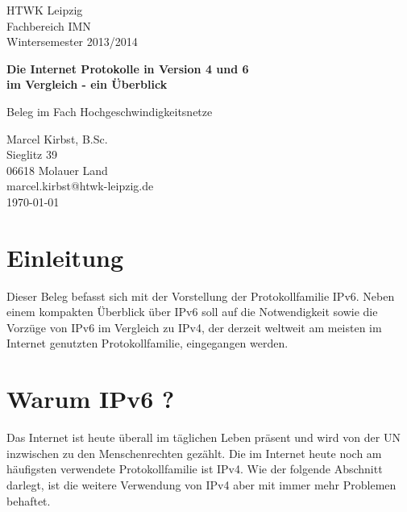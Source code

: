 \documentclass[a4paper,12pt]{scrartcl}
\begin{document}
 
\begin{titlepage}
\begin{small}
\vfill {HTWK Leipzig\\
Fachbereich IMN \\
Wintersemester 2013/2014}
\end{small}
 
\begin{center}
\begin{Large}
\vfill {\textsf{\textbf{
Die Internet Protokolle in Version 4 und 6\\
im Vergleich - ein \"Uberblick\\
}}}
\end{Large}
Beleg im Fach Hochgeschwindigkeitsnetze
\end{center}
 
\begin{small}
\vfill Marcel Kirbst, B.Sc. \\ Sieglitz 39 \\ 06618 Molauer Land \\
marcel.kirbst@htwk-leipzig.de\\
\today
\end{small}
 
\end{titlepage}
 
\tableofcontents
\thispagestyle{empty}
 
\clearpage
 
\onehalfspacing
 
\pagestyle{plain}
 
\section{Einleitung}
Dieser Beleg befasst sich mit der Vorstellung der Protokollfamilie IPv6. Neben einem kompakten Überblick über IPv6 soll auf die Notwendigkeit sowie die Vorzüge von IPv6 im Vergleich zu IPv4, der derzeit weltweit am meisten im Internet genutzten Protokollfamilie, eingegangen werden.
 
\section{Warum IPv6 ?}
Das Internet ist heute überall im täglichen Leben präsent und wird von der UN inzwischen zu den Menschenrechten gezählt.\cite{uninet} Die im Internet heute noch am häufigsten verwendete Protokollfamilie ist IPv4. Wie der folgende Abschnitt darlegt, ist die weitere Verwendung von IPv4 aber mit immer mehr Problemen behaftet.
\end{document}
